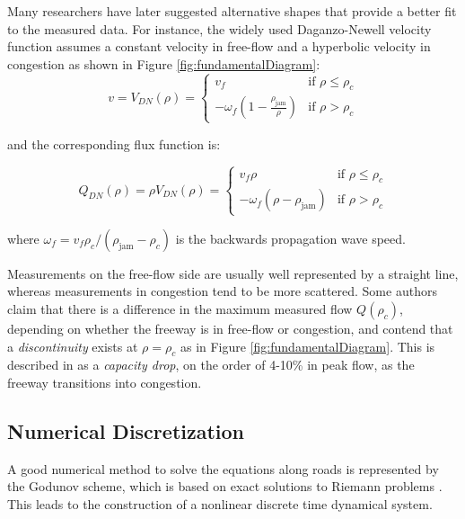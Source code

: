 Many researchers have later suggested alternative shapes that provide a better fit to the measured data. For instance, the widely used Daganzo-Newell velocity function assumes a constant velocity in free-flow and a hyperbolic velocity in congestion as shown in Figure \ref{fig:fundamentalDiagram}:
\noindent 
\begin{equation}\label{eq:dnVelocity}
v = V_{DN}(\rho) = \begin{cases}
v_{f} & \text{if } \rho \leq \rho_{c} \\
-\omega_{f} \left( 1 - \frac{\rho_{\text{jam}}}{\rho} \right) & \text{if } \rho > \rho_{c}
\end{cases}
\end{equation}

\noindent and the corresponding flux function is:

\begin{equation}\label{eq:dnFlux}
Q_{DN}(\rho) = \rho V_{DN}(\rho) = \begin{cases}
v_{f} \rho & \text{if } \rho \leq \rho_{c} \\
-\omega_{f} \left( \rho - \rho_{\text{jam}} \right) & \text{if } \rho > \rho_{c}
\end{cases}
\end{equation}

\noindent where $\omega_{f}=v_{f}\rho_{c}/(\rho_{\text{jam}}-\rho_{c})$ is the backwards propagation wave speed.

Measurements on the free-flow side are usually well represented by a straight line, whereas measurements in congestion tend to be more scattered. Some authors claim that there is a difference in the maximum measured flow $Q(\rho_{c})$, depending on whether the freeway is in free-flow or congestion, and contend that a \textit{discontinuity} exists at $\rho=\rho_{c}$ as in Figure \ref{fig:fundamentalDiagram}. This is described in \cite{Agyemang-Duah1991,Cassidy1999,Hall1991} as a \textit{capacity drop}, on the order of 4-10\% in peak flow, as the freeway transitions into congestion.

\subsection{Numerical Discretization}

A good numerical method to solve the equations along roads is represented by the Godunov scheme, which is based on exact solutions to Riemann problems \cite{Godlewski1996,Godunov1959}. This leads to the construction of a nonlinear discrete time dynamical system.


